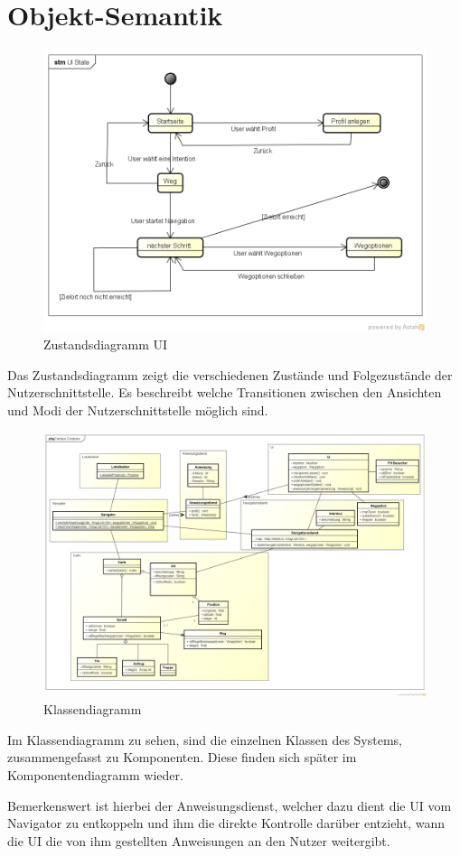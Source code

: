 \chapter{Objekt-Semantik}

\begin{figure}[h]
  \centering
  \includegraphics[width=\linewidth]{img/zustandsdiagramm.png}
  \caption{Zustandsdiagramm UI}
\label{fig:zustandsdiagramm}
\end{figure}

Das Zustandsdiagramm zeigt die verschiedenen Zustände und Folgezustände der
Nutzerschnittstelle. Es beschreibt welche Transitionen zwischen den Ansichten
und Modi der Nutzerschnittstelle möglich sind.

\begin{figure}[H]
  \centering
  \includegraphics[width=\linewidth]{img/klassendiagramm.png}
  \caption{Klassendiagramm}
\label{fig:klassenDiagramm}
\end{figure}

Im Klassendiagramm zu sehen, sind die einzelnen Klassen des Systems,
zusammengefasst zu Komponenten. Diese finden sich später im Komponentendiagramm
wieder.

\noindent
Bemerkenswert ist hierbei der Anweisungsdienst, welcher dazu dient die UI vom
Navigator zu entkoppeln und ihm die direkte Kontrolle darüber entzieht, wann die
UI die von ihm gestellten Anweisungen an den Nutzer weitergibt.
